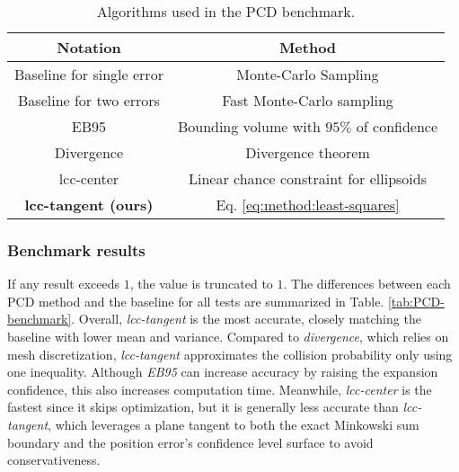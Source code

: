 \documentclass[conference]{IEEEtran}
\begin{document}
\begin{table}[tb]
\label{tab:pcd-benchmark-methods}
\caption{Algorithms used in the PCD benchmark.} 
\begin{tabular}{c c}
\hline  
Notation & Method                                  \\ [0.5ex] \hline 
Baseline for single error & Monte-Carlo Sampling \\
Baseline for two errors \cite{lambert2008fast}         & Fast Monte-Carlo sampling                    \\ 
EB95 \cite{dawson2020provably}        & Bounding volume with $95\%$ of confidence \\
Divergence \cite{park2020efficient}        & Divergence theorem               \\
lcc-center \cite{liu2023tight}  &  Linear chance constraint for ellipsoids \\
\textbf{lcc-tangent (ours)} & Eq. \ref{eq:method:least-squares} \\
\hline
\end{tabular}
\end{table}

\subsubsection{Benchmark results}
If any result exceeds $1$, the value is truncated to $1$. The differences between each PCD method and the baseline for all tests are summarized in Table. \ref{tab:PCD-benchmark}. 
Overall, \textit{lcc-tangent} is the most accurate, closely matching the baseline with lower mean and variance. Compared to \textit{divergence}, which relies on mesh discretization, \textit{lcc-tangent} approximates the collision probability only using one inequality. Although \textit{EB95} can increase accuracy by raising the expansion confidence, this also increases computation time. Meanwhile, \textit{lcc-center} is the fastest since it skips optimization, but it is generally less accurate than \textit{lcc-tangent}, which leverages a plane tangent to both the exact Minkowski sum boundary and the position error's confidence level surface to avoid conservativeness.
\end{document}
